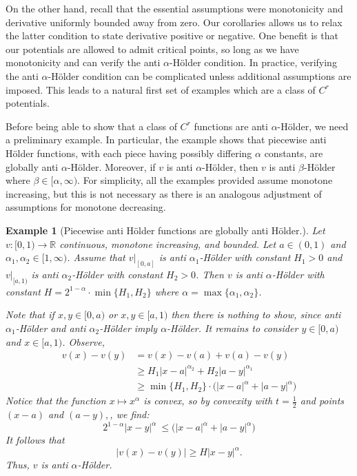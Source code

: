 \documentclass{amsart}
\newtheorem{example}{Example}
\newcommand{\RR}{\mathbb{R}}
\begin{document}
On the other hand, recall that the essential assumptions were monotonicity and derivative uniformly bounded away from zero. Our corollaries allows us to relax the latter condition to state derivative positive or negative. One benefit is that our potentials are allowed to admit critical points, so long as we have monotonicity and can verify the anti $\alpha$-H\"older condition. In practice, verifying the anti $\alpha$-H\"older condition can be complicated unless additional assumptions are imposed. This leads to a natural first set of examples which are a class of $C^r$ potentials. 

Before being able to show that a class of $C^r$ functions are anti $\alpha$-H\"older, we need a preliminary example. In particular, the example shows that piecewise anti H\"older functions, with each piece having possibly differing $\alpha$ constants, are globally anti $\alpha$-H\"older. Moreover, if $v$ is anti $\alpha$-H\"older, then $v$ is anti $\beta$-H\"older where $\beta\in [\alpha, \infty)$. For simplicity, all the examples provided assume monotone increasing, but this is not necessary as there is an analogous adjustment of assumptions for monotone decreasing.

\begin{example}[Piecewise anti H\"older functions are globally anti H\"older.]\label{ex.piece}
    Let $v: [0,1) \rightarrow \RR$ continuous, monotone increasing, and bounded. Let $a\in(0,1)$ and $\alpha_1, \alpha_2\in[1,\infty)$. Assume that $v|_{[0,a]}$ is anti $\alpha_1$-H\"older with constant $H_1>0$ and $v|_{[a,1)}$ is anti $\alpha_2$-H\"older with constant $H_2>0$. Then $v$ is anti $\alpha$-H\"older with  constant $H = 2^{1-\alpha}\cdot \min\{H_1, H_2\}$ where $\alpha = \max\{\alpha_1, \alpha_2\}$.

    Note that if $x,y\in [0,a)$ or $x,y\in [a,1)$ then there is nothing to show, since anti $\alpha_1$-H\"older and anti $\alpha_2$-H\"older imply $\alpha$-H\"older. It remains to consider $y\in [0,a)$ and $x\in [a,1)$. Observe,
    \begin{align*}
        v(x) - v(y) &= v(x) - v(a) + v(a) - v(y)\\
        &\geq H_1|x-a|^{\alpha_2} + H_2|a-y|^{\alpha_1}\\
        &\geq \min\{H_1, H_2\}\cdot \Big(|x-a|^{\alpha} + |a-y|^{\alpha}\Big)
    \end{align*}
    Notice that the function $x\mapsto x^\alpha$ is convex, so by convexity with $t= \frac{1}{2}$ and points $(x-a)$ and $(a-y),$, we find:
    \[2^{1-\alpha}|x-y|^\alpha\ \leq \Big(|x-a|^{\alpha} + |a-y|^{\alpha}\Big)\]
    It follows that
    \[|v(x) - v(y)|\geq H|x-y|^\alpha.\]
    Thus, $v$ is anti $\alpha$-H\"older.
\end{example}
\end{document}
